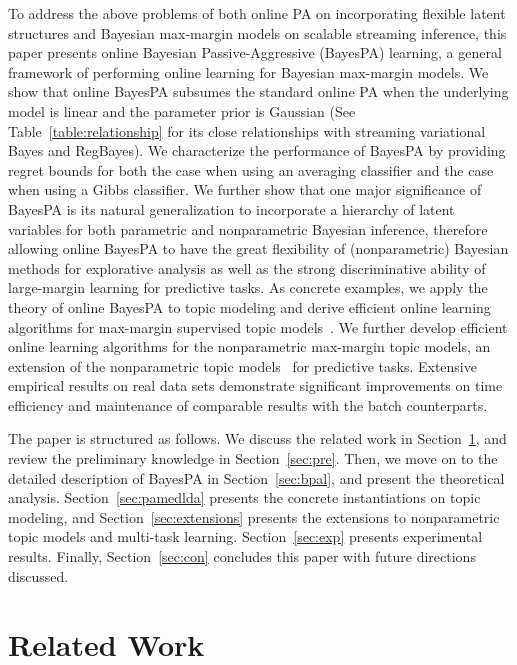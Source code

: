 \documentclass[twoside,11pt]{article}
\begin{document}
To address the above problems of both online PA on incorporating flexible latent structures and Bayesian max-margin models on scalable streaming inference, this paper presents online Bayesian Passive-Aggressive (BayesPA) learning, a general framework of performing online learning for Bayesian max-margin models. %
We show that online BayesPA subsumes the standard online PA when the underlying model is linear and the parameter prior is Gaussian (See Table~\ref{table:relationship} for its close relationships with streaming variational Bayes and RegBayes). We characterize the performance of BayesPA by providing regret bounds for both the case when using an averaging classifier and the case when using a Gibbs classifier. We further show that one major significance of BayesPA is its natural generalization to incorporate a hierarchy of latent variables for both parametric and nonparametric Bayesian inference, therefore allowing online BayesPA to have the great flexibility of (nonparametric) Bayesian methods for explorative analysis as well as the strong discriminative ability of large-margin learning for predictive tasks. As concrete examples, we apply the theory of online BayesPA to topic modeling and derive efficient online learning algorithms for max-margin supervised topic models~\citep{zhu2012medlda}. We further develop efficient online learning algorithms for the nonparametric max-margin topic models, an extension of the nonparametric topic models~\citep{teh2006hierarchical} for predictive tasks. Extensive empirical results on real data sets demonstrate significant improvements on time efficiency and maintenance of comparable results with the batch counterparts.

The paper is structured as follows. We discuss the related work in Section~\ref{sec:relatedwork}, and review the preliminary knowledge in Section~\ref{sec:pre}. Then, we move on to the detailed description of BayesPA in Section~\ref{sec:bpal}, and present the theoretical analysis. Section~\ref{sec:pamedlda} presents the concrete instantiations on topic modeling, and Section~\ref{sec:extensions} presents the extensions to nonparametric topic models and multi-task learning. Section~\ref{sec:exp} presents experimental results. Finally, Section~\ref{sec:con} concludes this paper with future directions discussed.

\section{Related Work}\label{sec:relatedwork}
\end{document}
